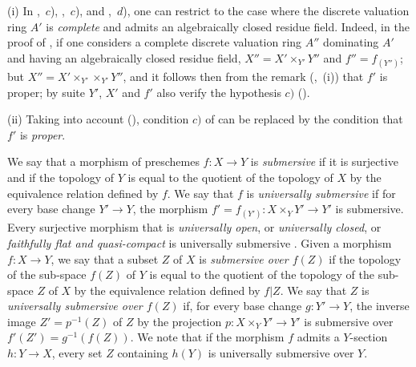 \begin{remarks}[15.7.7]
\label{IV.15.7.7}
(i)
In ,~$c$), ,~$c$), and ,~$d$), one can restrict to the case where the discrete valuation ring $A'$ is \emph{complete} and admits an algebraically closed residue field.
Indeed, in the proof of , if one considers a complete discrete valuation ring $A''$ dominating $A'$ and having an algebraically closed residue field, $X''=X'\times_{Y'}Y''$ and $f''=f_{(Y'')}$; but $X''=X'\times_{Y'}\times_{Y'}Y''$, and it follows then from the remark (,~(i)) that $f'$ is proper; by suite $Y'$, $X'$ and $f'$ also verify the hypothesis $c)$ ().

(ii)
Taking into account (), condition $c)$ of  can be replaced by the condition that $f'$ is \emph{proper}.
\end{remarks}

\begin{env}[15.7.8]
\label{IV.15.7.8}
We say that a morphism of preschemes $f:X\to Y$ is \emph{submersive} if it is surjective and if the topology of $Y$ is equal to the quotient of the topology of $X$ by the equivalence relation defined by $f$.
We say that $f$ is \emph{universally submersive} if for every base change $Y'\to Y$, the morphism $f'=f_{(Y')}:X\times_Y Y'\to Y'$ is submersive.
Every surjective morphism that is \emph{universally open}, or \emph{universally closed}, or \emph{faithfully flat and quasi-compact} is universally submersive .
Given a morphism $f:X\to Y$, we say that a subset $Z$ of $X$ is \emph{submersive over $f(Z)$} if the topology of the sub-space $f(Z)$ of $Y$ is equal to the quotient of the topology of the sub-space $Z$ of $X$ by the equivalence relation defined by $f|Z$.
We say that $Z$ is \emph{universally submersive over $f(Z)$} if, for every base change $g:Y'\to Y$, the inverse image $Z'=p^{-1}(Z)$ of $Z$ by the projection $p:X\times_Y Y'\to Y'$ is submersive over $f'(Z')=g^{-1}(f(Z))$.
We note that if the morphism $f$ admits a $Y$-section $h:Y\to X$, every set $Z$ containing $h(Y)$ is universally submersive over $Y$.
\end{env}

